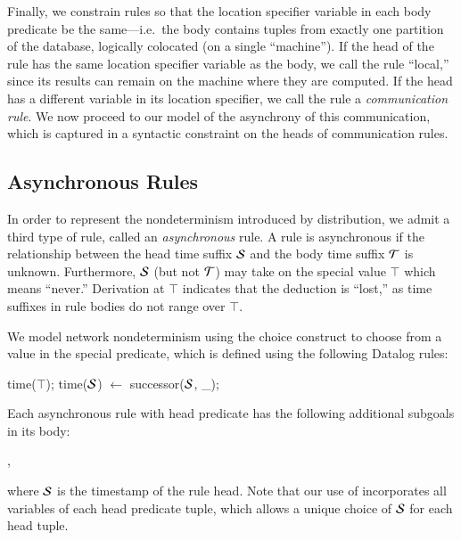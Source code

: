 Finally, we constrain \lang rules so that the location specifier variable in each body predicate be the same---i.e.\ the body contains tuples from exactly one partition of the database, logically colocated (on a single ``machine'').  If the head of the rule has the same location specifier variable as the body, we call the rule ``local,'' since its results can remain on the machine where they are computed.  If the head has a different variable in its location specifier, we call the rule a {\em communication rule}.  We now proceed to our model of the asynchrony of this communication, which is captured in a syntactic constraint on the heads of communication rules.

\subsection{Asynchronous Rules}

In order to represent the nondeterminism introduced by distribution, we admit a
third type of rule, called an {\em asynchronous} rule.  A rule is asynchronous
if the 
relationship between the head time suffix $\SDedalus$ and the body time suffix $\Tau$ is
unknown.  Furthermore, $\SDedalus$ (but not $\Tau$) may take on the special value
$\top$ which means ``never.''  Derivation at $\top$ indicates that the
deduction is ``lost,'' as time suffixes in rule bodies do not range over
$\top$.

We model network nondeterminism using the choice construct to choose
from a value in the special 
predicate, which is defined using the following Datalog rules:

\begin{Dedalus}
time(\(\top\));
time(\(\SDedalus\)) \(\leftarrow\) successor(\(\SDedalus\), _);
\end{Dedalus}

\noindent
Each asynchronous rule with head predicate  has the following additional subgoals in its
body:

, 

\noindent
where
$\SDedalus$ is the timestamp of the rule head.  Note that our use of  incorporates all variables of each head predicate tuple, which allows a unique choice of $\SDedalus$ for each head tuple.


